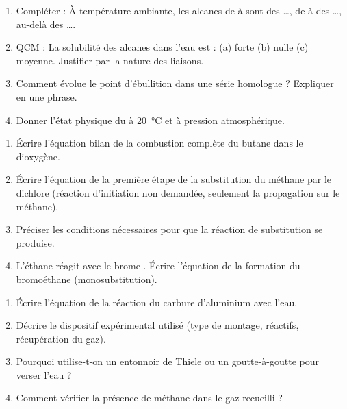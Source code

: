 \documentclass[11pt]{article}
\begin{document}
\begin{exercice}
\begin{enumerate}
    \item Compléter : À température ambiante, les alcanes de  à  sont des \ldots{}, de  à  des \ldots{}, au-delà des \ldots{}.
    \item QCM : La solubilité des alcanes dans l'eau est : (a) forte \quad (b) nulle \quad (c) moyenne. Justifier par la nature des liaisons.
    \item Comment évolue le point d'ébullition dans une série homologue ? Expliquer en une phrase.
    \item Donner l'état physique du  à \SI{20}{\celsius} et à pression atmosphérique.
\end{enumerate}
\end{exercice}

\begin{exercice}
\begin{enumerate}
    \item Écrire l'équation bilan de la combustion complète du butane  dans le dioxygène.
    \item Écrire l'équation de la première étape de la substitution du méthane par le dichlore  (réaction d'initiation non demandée, seulement la propagation sur le méthane).
    \item Préciser les conditions nécessaires pour que la réaction de substitution se produise.
    \item L'éthane  réagit avec le brome . Écrire l'équation de la formation du bromoéthane (monosubstitution).
\end{enumerate}
\end{exercice}

\begin{exercice}
\begin{enumerate}
    \item Écrire l'équation de la réaction du carbure d'aluminium  avec l'eau.
    \item Décrire le dispositif expérimental utilisé (type de montage, réactifs, récupération du gaz).
    \item Pourquoi utilise-t-on un entonnoir de Thiele ou un goutte-à-goutte pour verser l'eau ?
    \item Comment vérifier la présence de méthane dans le gaz recueilli ?
\end{enumerate}
\end{exercice}
\end{document}
